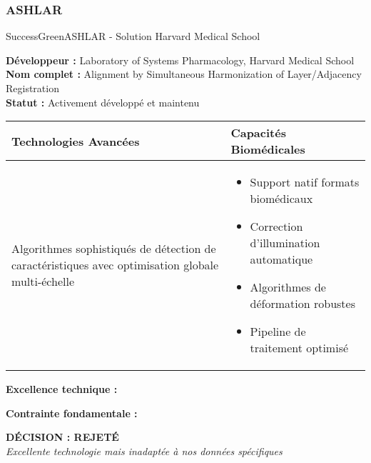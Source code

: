 \subsubsection{ASHLAR}

\begin{techbox}{SuccessGreen}{ASHLAR - Solution Harvard Medical School}

\textbf{Développeur :} Laboratory of Systems Pharmacology, Harvard Medical School \\
\textbf{Nom complet :} Alignment by Simultaneous Harmonization of Layer/Adjacency Registration \\
\textbf{Statut :} Activement développé et maintenu

\vspace{0.5cm}

\begin{tabularx}{\textwidth}{|X|X|}
\hline
\rowcolor{LightGray}
\textbf{Technologies Avancées} & \textbf{Capacités Biomédicales} \\
\hline
Algorithmes sophistiqués de détection de caractéristiques avec optimisation globale multi-échelle &
\begin{itemize}[nosep]
\item Support natif formats biomédicaux
\item Correction d'illumination automatique
\item Algorithmes de déformation robustes
\item Pipeline de traitement optimisé
\end{itemize} \\
\hline
\end{tabularx}

\vspace{0.5cm}

\textbf{Excellence technique :}
\begin{itemize}[leftmargin=*]
\end{itemize}

\textbf{Contrainte fondamentale :}
\begin{itemize}[leftmargin=*]
\end{itemize}

\begin{center}
\textbf{\textcolor{WarningOrange}{DÉCISION : REJETÉ}}\\
\textit{Excellente technologie mais inadaptée à nos données spécifiques}
\end{center}

\end{techbox}

